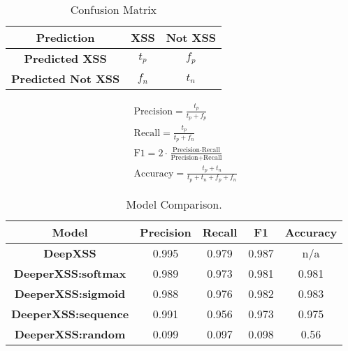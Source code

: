 \begin{table}
\begin{center}
\begingroup
\setlength{\tabcolsep}{10pt} %
\renewcommand{\arraystretch}{1.5} %
\begin{tabular}{|| c | c | c ||} 
    \hline
    Prediction & XSS & Not XSS \\ 
    \hline\hline
    \textbf{Predicted XSS} &  $t_p$ & $f_p$ \\ 
    \hline
    \textbf{Predicted Not XSS} & $f_n$ & $t_n$ \\
    \hline
\end{tabular}
\endgroup
\caption{\label{conf-mat}Confusion Matrix}
\end{center}
\end{table}


\begin{align*}
    &\text{Precision} = \frac{t_p}{t_p + f_p} \\[10pt]
    &\text{Recall} = \frac{t_p}{t_p + f_n} \\[10pt]
    &\text{F1} = 2 \cdot \frac{\text{Precision} \cdot \text{Recall}}{\text{Precision} + \text{Recall}}\\[10pt]
    &\text{Accuracy} = \frac{t_p + t_n}{t_p + t_n + f_p + f_n}
\end{align*}

\begin{table}
\begin{center}
\begingroup
\setlength{\tabcolsep}{10pt} %
\renewcommand{\arraystretch}{1.5} %
\begin{tabular}{|| c | c | c | c | c ||} 
    \hline
    Model & Precision & Recall & F1 & Accuracy \\ 
    \hline\hline
    \textbf{DeepXSS} &  0.995 & 0.979 & 0.987 & n/a \\ 
    \hline
    \textbf{DeeperXSS:softmax} & 0.989 & 0.973 & 0.981 & 0.981 \\
    \hline
    \textbf{DeeperXSS:sigmoid} & 0.988 & 0.976 & 0.982 & 0.983 \\
    \hline
    \textbf{DeeperXSS:sequence} & 0.991 & 0.956 & 0.973 & 0.975 \\
    \hline
    \textbf{DeeperXSS:random} & 0.099 & 0.097 & 0.098 & 0.56 \\
    \hline
\end{tabular}
\endgroup
\caption{\label{comparison}Model Comparison.}
\end{center}
\end{table}
